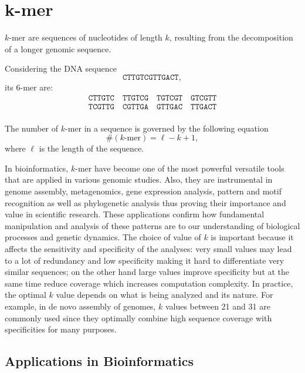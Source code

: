 \section[$k$-mer]{k-mer}
\label{sec:kmer}

$k$-mer are sequences of nucleotides of length $k$, resulting from the decomposition of a longer genomic sequence.

\begin{example}
	Considering the DNA sequence \[ \texttt{CTTGTCGTTGACT}, \] its 6-mer are: \begin{gather*}
		\texttt{CTTGTC} \quad \texttt{TTGTCG} \quad \texttt{TGTCGT} \quad \texttt{GTCGTT}\\
		\texttt{TCGTTG} \quad \texttt{CGTTGA} \quad \texttt{GTTGAC} \quad \texttt{TTGACT} \\
	\end{gather*}
\end{example}

The number of $k$-mer in a sequence is governed by the following equation \[ \#(k\text{-mer}) = \ell - k + 1, \] where $\ell$ is the length of the sequence.

In bioinformatics, $k$-mer have become one of the most powerful versatile tools that are applied in various genomic studies. Also, they are instrumental in genome assembly, metagenomics, gene expression analysis, pattern and motif recognition as well as phylogenetic analysis thus proving their importance and value in scientific research. These applications confirm how fundamental manipulation and analysis of these patterns are to our understanding of biological processes and genetic dynamics. The choice of value of $k$ is important because it affects the sensitivity and specificity of the analyses: very small values may lead to a lot of redundancy and low specificity making it hard to differentiate very similar sequences; on the other hand large values improve specificity but at the same time reduce coverage which increases computation complexity. In practice, the optimal $k$ value depends on what is being analyzed and its nature. For example, in de novo assembly of genomes, $k$ values between 21 and 31 are commonly used since they optimally combine high sequence coverage with specificities for many purposes.




	\subsection{Applications in Bioinformatics}
	\label{subsec:kmer-applications}
	
